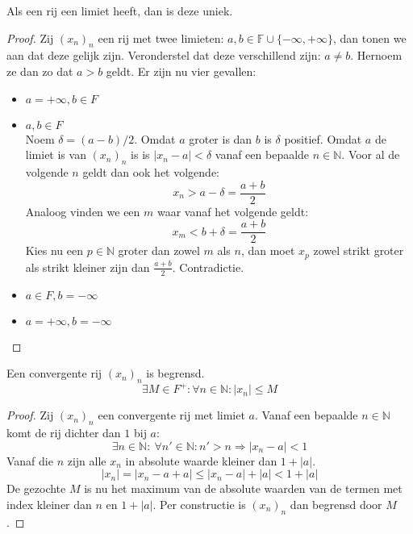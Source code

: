 \documentclass[main.tex]{subfiles}
\begin{document}
\begin{bpr}
  Als een rij een limiet heeft, dan is deze uniek.

  \begin{proof}
    Zij $(x_{n})_{n}$ een rij met twee limieten: $a,b \in \mathbb{F}\cup \{-\infty,+\infty\}$, dan tonen we aan dat deze gelijk zijn.
    Veronderstel dat deze verschillend zijn: $a \neq b$.
    Hernoem ze dan zo dat $a > b$ geldt.
    Er zijn nu vier gevallen:
    \begin{itemize}
    \item $a = +\infty, b \in F$\\
    \item $a,b\in F$\\
      Noem $\delta = (a-b)/2$.
      Omdat $a$ groter is dan $b$ is $\delta$ positief.
      Omdat $a$ de limiet is van $(x_{n})_{n}$ is is $|x_{n}-a|<\delta$ vanaf een bepaalde $n\in \mathbb{N}$.
      Voor al de volgende $n$ geldt dan ook het volgende:
      \[ x_{n}>a-\delta = \frac{a+b}{2} \]
      Analoog vinden we een $m$ waar vanaf het volgende geldt:
      \[ x_{m}<b+\delta=\frac{a+b}{2} \]
      Kies nu een $p\in \mathbb{N}$ groter dan zowel $m$ als $n$, dan moet $x_{p}$ zowel strikt groter als strikt kleiner zijn dan $\frac{a+b}{2}$.
      Contradictie.
    \item $a\in F, b = -\infty$\\
    \item $a= +\infty, b=-\infty$\\
    \end{itemize}
  \end{proof}
\end{bpr}

\begin{bpr}
  \label{pr:convergente-rij-begrensd}
  Een convergente rij $(x_{n})_{n}$ is begrensd.
  \[ \exists M \in F^{+}: \forall n\in \mathbb{N}: |x_{n}| \le M \]

  \begin{proof}
    Zij $(x_{n})_{n}$ een convergente rij met limiet $a$.
    Vanaf een bepaalde $n\in \mathbb{N}$ komt de rij dichter dan $1$ bij $a$:
    \[ \exists n\in \mathbb{N}:\ \forall n'\in \mathbb{N}: n'>n\Rightarrow |x_{n}-a|<1 \]
    Vanaf die $n$ zijn alle $x_{n}$ in absolute waarde kleiner dan $1+|a|$.
    \[ |x_{n}| = |x_{n}-a+a| \le |x_{n}-a|+|a| <1+|a| \]
    De gezochte $M$ is nu het maximum van de absolute waarden van de termen met index kleiner dan $n$ en $1+|a|$.
    Per constructie is $(x_{n})_{n}$ dan begrensd door $M$.
  \end{proof}
\end{bpr}
\end{document}
